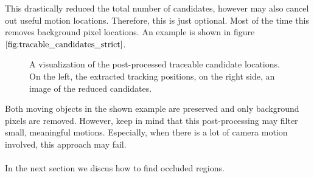 This drastically reduced the total number of candidates, however may also cancel out useful motion locations. Therefore, this is just optional. Most of the time this removes background pixel locations. An example is shown in figure $\ref{fig:tracable_candidates_strict}$.
\begin{figure}[H]
\begin{center}
\end{center}
\caption[Strict Dense Candidates]{A visualization of the post-processed traceable candidate locations. On the left, the extracted tracking positions, on the right side, an image of the reduced candidates.}
\label{fig:tracable_candidates_strict}
\end{figure}
Both moving objects in the shown example are preserved and only background pixels are removed. However, keep in mind that this post-processing may filter small, meaningful motions. Especially, when there is a lot of camera motion involved, this approach may fail. \\ \\
In the next section we discus how to find occluded regions.

